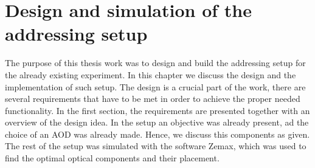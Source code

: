 \chapter{Design and simulation of the addressing setup}
The purpose of this thesis work was to design and build the addressing setup for the already existing experiment. In this chapter we discuss the design and the implementation of such setup. The design is a crucial part of the work, there are several requirements that have to be met in order to achieve the proper needed functionality. In the first section, the requirements are presented together with an overview of the design idea. In the setup an objective was already present, ad the choice of an AOD was already made. Hence, we discuss this components as given. The rest of the setup was simulated with the software Zemax, which was used to find the optimal optical components and their placement.
